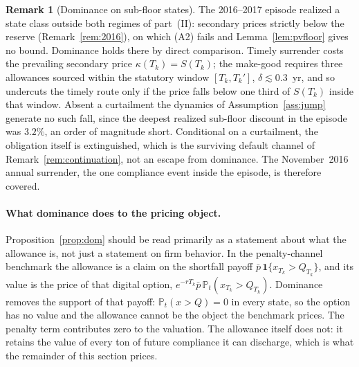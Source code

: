 \documentclass[11pt,letterpaper]{article}
\theoremstyle{plain}
\theoremstyle{definition}
\newtheorem{remark}[theorem]{Remark}
\newcommand{\Prob}{\mathbb{P}}               %
\numberwithin{equation}{section}
\begin{document}
\begin{remark}[Dominance on sub-floor states]\label{rem:subfloor}
The 2016--2017 episode realized a state class outside both regimes of part~(II): secondary prices strictly below the reserve (Remark~\ref{rem:2016}), on which (A2) fails and Lemma~\ref{lem:pvfloor} gives no bound. Dominance holds there by direct comparison. Timely surrender costs the prevailing secondary price $\kappa(T_k)=S(T_k)$; the make-good requires three allowances sourced within the statutory window $[T_k,T_k']$, $\delta\lesssim0.3$~yr, and so undercuts the timely route only if the price falls below one third of $S(T_k)$ inside that window. Absent a curtailment the dynamics of Assumption~\ref{ass:jump} generate no such fall, since the deepest realized sub-floor discount in the episode was $3.2\%$, an order of magnitude short. Conditional on a curtailment, the obligation itself is extinguished, which is the surviving default channel of Remark~\ref{rem:continuation}, not an escape from dominance. The November~2016 annual surrender, the one compliance event inside the episode, is therefore covered.
\end{remark}

\paragraph{What dominance does to the pricing object.}
Proposition~\ref{prop:dom} should be read primarily as a statement about what the allowance is, not just a statement on firm behavior. In the penalty-channel benchmark the allowance is a claim on the shortfall payoff $\bar p\,\mathbf{1}\{x_{T_k}>Q_{T_k}\}$, and its value is the price of that digital option, $e^{-rT_k}\bar p\, \Prob_t(x_{T_k}>Q_{T_k})$. Dominance removes the support of that payoff: $\Prob_t(x>Q)=0$ in every state, so the option has no value and the allowance cannot be the object the benchmark prices. The penalty term contributes zero to the
valuation. The allowance itself does not: it retains the value of every ton of future compliance it can discharge, which is what the remainder of this section prices.
\end{document}
